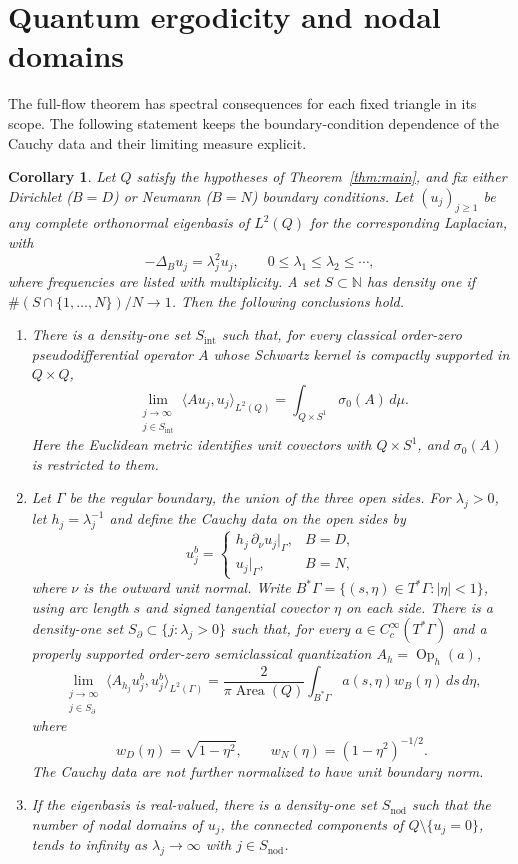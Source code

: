 \documentclass[11pt]{article}
\newtheorem{corollary}[theorem]{Corollary}
\theoremstyle{remark}
\newcommand{\dd}{\,d}
\begin{document}
\section{Quantum ergodicity and nodal domains}\label{sec:spectral}
The full-flow theorem has spectral consequences for each fixed triangle
in its scope. The following statement keeps the boundary-condition
dependence of the Cauchy data and their limiting measure explicit.

\begin{corollary}\label{cor:quantum}
Let \(Q\) satisfy the hypotheses of Theorem~\ref{thm:main}, and fix
either Dirichlet (\(B=D\)) or Neumann (\(B=N\)) boundary conditions.
Let \((u_j)_{j\ge1}\) be any complete orthonormal eigenbasis of
\(L^2(Q)\) for the corresponding Laplacian, with
\[
 -\Delta_B u_j=\lambda_j^2u_j,\qquad
 0\le\lambda_1\le\lambda_2\le\cdots,
\]
where frequencies are listed with multiplicity. A set
\(S\subset\mathbb N\) has density one if
\(\#(S\cap\{1,\ldots,N\})/N\to1\).
Then the following conclusions hold.
\begin{enumerate}
\item There is a density-one set \(S_{\mathrm{int}}\) such that, for
every classical order-zero pseudodifferential operator \(A\) whose
Schwartz kernel is compactly supported in \(Q\times Q\),
\[
 \lim_{\substack{j\to\infty\\j\in S_{\mathrm{int}}}}
 \langle Au_j,u_j\rangle_{L^2(Q)}
 =\int_{Q\times S^1}\sigma_0(A)\dd\mu.
\]
Here the Euclidean metric identifies unit covectors with \(Q\times S^1\),
and \(\sigma_0(A)\) is restricted to them.
\item Let \(\Gamma\) be the regular boundary, the union of the three open sides.
For \(\lambda_j>0\), let \(h_j=\lambda_j^{-1}\) and define the Cauchy
data on the open sides by
\[
 u_j^b=\begin{cases}
 h_j\,\partial_\nu u_j|_\Gamma,&B=D,\\
 u_j|_\Gamma,&B=N,
 \end{cases}
\]
where \(\nu\) is the outward unit normal. Write
\(B^*\Gamma=\{(s,\eta)\in T^*\Gamma:|\eta|<1\}\), using arc length
\(s\) and signed tangential covector \(\eta\) on each side. There is
a density-one set \(S_\partial\subset\{j:\lambda_j>0\}\) such that,
for every \(a\in C_c^\infty(T^*\Gamma)\) and a properly supported order-zero
semiclassical quantization \(A_h=\operatorname{Op}_h(a)\),
\[
 \lim_{\substack{j\to\infty\\j\in S_\partial}}
 \langle A_{h_j}u_j^b,u_j^b\rangle_{L^2(\Gamma)}
 =\frac{2}{\pi\operatorname{Area}(Q)}
  \int_{B^*\Gamma}a(s,\eta)w_B(\eta)\dd s\,d\eta,
\]
where
\[
 w_D(\eta)=\sqrt{1-\eta^2},\qquad
 w_N(\eta)=(1-\eta^2)^{-1/2}.
\]
The Cauchy data are not further normalized to have unit boundary norm.
\item If the eigenbasis is real-valued, there is a density-one set
\(S_{\mathrm{nod}}\) such that the number of nodal domains of \(u_j\),
the connected components of \(Q\setminus\{u_j=0\}\), tends to infinity
as \(\lambda_j\to\infty\) with \(j\in S_{\mathrm{nod}}\).
\end{enumerate}
\end{corollary}
\end{document}
